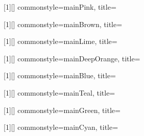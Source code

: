 [1][]{
	commonstyle=mainPink,
	title={}
}

[1][]{
	commonstyle=mainBrown,
	title={}
}

[1][]{
	commonstyle=mainLime,
	title={}
}

[1][]{
	commonstyle=mainDeepOrange,
	title={}
}

[1][]{
	commonstyle=mainBlue,
	title={}
}

[1][]{
	commonstyle=mainTeal,
	title={}
}

[1][]{
	commonstyle=mainGreen,
	title={}
}

[1][]{
	commonstyle=mainCyan,
	title={}
}


\newcommand{\trous}[1]{\makebox[#1]{\rule{0pt}{1.2ex}\dotfill}}

\newcommand{\divfrac}[2]{\left.\raisebox{.2ex}{$#1$}\middle/\raisebox{-.2ex}{$#2$}\right.}

\newcommand{\vect}[1]{\overrightarrow{#1}}
\newcommand{\norme}[1]{\left\lVert #1 \right\rVert}
\newcommand{\abs}[1]{\left| #1 \right|}
\newcommand{\coord}[2]{\begin{pmatrix} #1 \\ #2 \end{pmatrix}}

\newcommand{\arc}[1]{\widehat{#1}}
\newcommand{\angw}[1]{\widehat{#1}}

\newcommand{\unite}[1]{\,\text{#1}}

